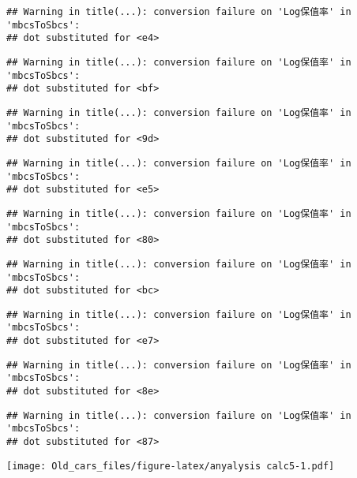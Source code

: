 \documentclass[]{article}
\begin{document}
\begin{verbatim}
## Warning in title(...): conversion failure on 'Log保值率' in 'mbcsToSbcs':
## dot substituted for <e4>
\end{verbatim}

\begin{verbatim}
## Warning in title(...): conversion failure on 'Log保值率' in 'mbcsToSbcs':
## dot substituted for <bf>
\end{verbatim}

\begin{verbatim}
## Warning in title(...): conversion failure on 'Log保值率' in 'mbcsToSbcs':
## dot substituted for <9d>
\end{verbatim}

\begin{verbatim}
## Warning in title(...): conversion failure on 'Log保值率' in 'mbcsToSbcs':
## dot substituted for <e5>
\end{verbatim}

\begin{verbatim}
## Warning in title(...): conversion failure on 'Log保值率' in 'mbcsToSbcs':
## dot substituted for <80>
\end{verbatim}

\begin{verbatim}
## Warning in title(...): conversion failure on 'Log保值率' in 'mbcsToSbcs':
## dot substituted for <bc>
\end{verbatim}

\begin{verbatim}
## Warning in title(...): conversion failure on 'Log保值率' in 'mbcsToSbcs':
## dot substituted for <e7>
\end{verbatim}

\begin{verbatim}
## Warning in title(...): conversion failure on 'Log保值率' in 'mbcsToSbcs':
## dot substituted for <8e>
\end{verbatim}

\begin{verbatim}
## Warning in title(...): conversion failure on 'Log保值率' in 'mbcsToSbcs':
## dot substituted for <87>
\end{verbatim}
\usepackage[utf8]{inputenc}
\texttt{[image: Old\_cars\_files/figure-latex/anyalysis calc5-1.pdf]}
\end{document}
